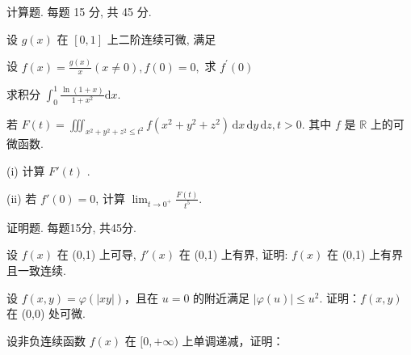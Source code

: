 \par{}
计算题. 每题 15 分, 共 45 分.\par
\par{}
设 $g(x)$ 在 $[0,1]$ 上二阶连续可微, 满足\par
\nopagebreak[4]
设 $f(x) = \frac{g(x)}{x} (x\neq 0),f(0) = 0,$ 求 $f^{\prime}(0)$\par
求积分 $\int_0^1\frac{\ln(1 + x)}{1 + x^2}\mathrm{d}x.$\par
若 $F(t) = \iiint_{x^2 + y^2 + z^2 \leq t^2} f(x^2 + y^2 + z^2) \, \mathrm{d}x \, \mathrm{d}y \, \mathrm{d}z, t > 0$. 其中 $f$ 是 $\mathbb{R}$ 上的可微函数.\par
(i) 计算  $F'(t)$ .\par
(ii) 若 $f'(0) = 0$, 计算 $\lim_{t \to 0^+} \frac{F(t)}{t^5}$.\par
\par{}
证明题. 每题15分, 共45分.\par
设 $f(x)$ 在 (0,1) 上可导, $f'(x)$ 在 (0,1) 上有界, 证明: $f(x)$ 在 (0,1) 上有界且一致连续.\par
设 $f(x, y) = \varphi(|xy|)$，且在 $u = 0$ 的附近满足 $|\varphi(u)| \leq u^2$. 证明：$f(x, y)$ 在 (0,0) 处可微.\par
\par{}
设非负连续函数 $f(x)$ 在 $[0, +\infty)$ 上单调递减，证明：\par
\nopagebreak[4]
